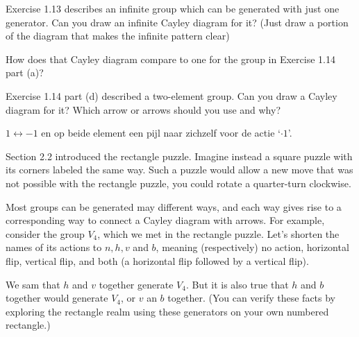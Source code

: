 \begin{questions}
	\question Exercise 1.13 describes an infinite group which can be generated with just one generator. Can you draw an infinite Cayley diagram for it? (Just draw a portion of the diagram that makes the infinite pattern clear)
	\par How does that Cayley diagram compare to one for the group in Exercise 1.14 part (a)?
	
	\question Exercise 1.14 part (d) described a two-element group. Can you draw a Cayley diagram for it? Which arrow or arrows should you use and why?
	\begin{solution}
		\par $1 \leftrightarrow -1$ en op beide element een pijl naar zichzelf voor de actie `$\cdot 1$'.
	\end{solution}

	\question Section 2.2 introduced the rectangle puzzle. Imagine instead a square puzzle with its corners labeled the same way. Such a puzzle would allow a new move that was not possible with the rectangle puzzle, you could rotate a quarter-turn clockwise.
	
	\question Most groups can be generated may different ways, and each way gives rise to a corresponding way to connect a Cayley diagram with arrows. For example, consider the group $V_4$, which we met in the rectangle puzzle. Let's shorten the names of its actions to $n, h, v$ and $b$, meaning (respectively) no action, horizontal flip, vertical flip, and both (a horizontal flip followed by a vertical flip).
	\par We sam that $h$ and $v$ together generate $V_4$. But it is also true that $h$ and $b$ together would generate $V_4$, or $v$ an $b$ together. (You can verify these facts by exploring the rectangle realm using these generators on your own numbered rectangle.)
	\begin{parts}

\end{parts}
\end{questions}
